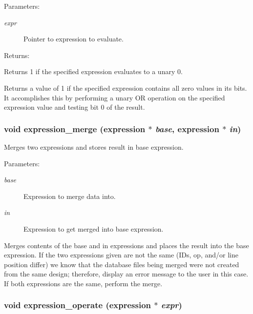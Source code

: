 \begin{Desc}
\item[Parameters: ]\par
\begin{description}
\item[{\em 
expr}]Pointer to expression to evaluate.\end{description}
\end{Desc}
\begin{Desc}
\item[Returns: ]\par
Returns 1 if the specified expression evaluates to a unary 0.\end{Desc}
Returns a value of 1 if the specified expression contains all zero values in its bits. It accomplishes this by performing a unary OR operation on the specified expression value and testing bit 0 of the result. 
\subsubsection{\setlength{\rightskip}{0pt plus 5cm}void expression\_\-merge ({\bf expression} $\ast$ {\em base}, {\bf expression} $\ast$ {\em in})}\label{expr_8h_a2}


Merges two expressions and stores result in base expression.

\begin{Desc}
\item[Parameters: ]\par
\begin{description}
\item[{\em 
base}]Expression to merge data into. \item[{\em 
in}]Expression to get merged into base expression.\end{description}
\end{Desc}
Merges contents of the base and in expressions and places the result into the base expression. If the two expressions given are not the same (IDs, op, and/or line position differ) we know that the database files being merged  were not created from the same design; therefore, display an error message  to the user in this case. If both expressions are the same, perform the  merge. 
\subsubsection{\setlength{\rightskip}{0pt plus 5cm}void expression\_\-operate ({\bf expression} $\ast$ {\em expr})}\label{expr_8h_a7}


